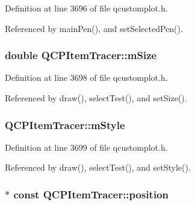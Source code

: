 Definition at line 3696 of file qcustomplot.\+h.



Referenced by main\+Pen(), and set\+Selected\+Pen().

\hypertarget{class_q_c_p_item_tracer_a575153a24bb357d1e006f6bc3bd099b9}{}
\subsubsection[{m\+Size}]{\setlength{\rightskip}{0pt plus 5cm}double Q\+C\+P\+Item\+Tracer\+::m\+Size\hspace{0.3cm}{\ttfamily [protected]}}\label{class_q_c_p_item_tracer_a575153a24bb357d1e006f6bc3bd099b9}


Definition at line 3698 of file qcustomplot.\+h.



Referenced by draw(), select\+Test(), and set\+Size().

\hypertarget{class_q_c_p_item_tracer_afb1f236bebf417544e0138fef22a292e}{}
\subsubsection[{m\+Style}]{ Q\+C\+P\+Item\+Tracer\+::m\+Style\hspace{0.3cm}{\ttfamily [protected]}}\label{class_q_c_p_item_tracer_afb1f236bebf417544e0138fef22a292e}


Definition at line 3699 of file qcustomplot.\+h.



Referenced by draw(), select\+Test(), and set\+Style().

\hypertarget{class_q_c_p_item_tracer_a69917e2fdb2b3a929c196958feee7cbe}{}
\subsubsection[{position}]{$\ast$ const Q\+C\+P\+Item\+Tracer\+::position}\label{class_q_c_p_item_tracer_a69917e2fdb2b3a929c196958feee7cbe}


